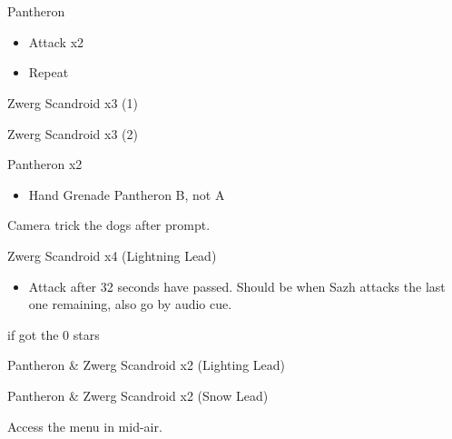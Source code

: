 \chapter{}

\begin{battle}{Pantheron}
\begin{itemize}
    \item Attack x2
    \item Repeat
\end{itemize}
\end{battle}

\begin{battle}{Zwerg Scandroid x3 (1)}
\end{battle}

\begin{battle}{Zwerg Scandroid x3 (2)}
\end{battle}

\begin{battle}{Pantheron x2}
\begin{itemize}
    \item Hand Grenade Pantheron B, not A
\end{itemize}
\end{battle}

Camera trick the dogs after prompt.

\begin{battle}{Zwerg Scandroid x4 (Lightning Lead)}
\begin{itemize}
    \item Attack after 32 seconds have passed. Should be when Sazh attacks the last one remaining, also go by audio cue.
\end{itemize}
 if got the 0 stars
\end{battle}


\begin{battle}{Pantheron \& Zwerg Scandroid x2 (Lighting Lead)}
\end{battle}


\begin{battle}{Pantheron \& Zwerg Scandroid x2 (Snow Lead)}
\end{battle}

Access the menu in mid-air.

